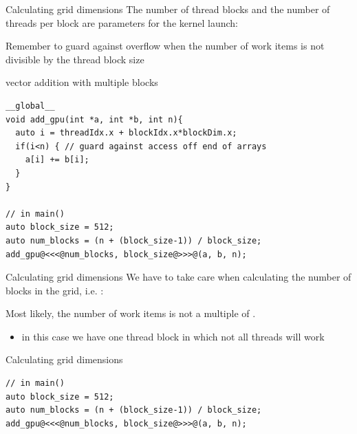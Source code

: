 \begin{frame}[fragile]{}
    \begin{info}{Calculating grid dimensions}
            The number of thread blocks and the number of threads per block are parameters for the kernel launch:
            \begin{center}
            \end{center}
            Remember to guard against overflow when the number of work items is not divisible by the thread block size
    \end{info}

    \begin{code}{vector addition with multiple blocks}
        \begin{lstlisting}[style=boxcudatiny]
__global__
void add_gpu(int *a, int *b, int n){
  auto i = threadIdx.x + blockIdx.x*blockDim.x;
  if(i<n) { // guard against access off end of arrays
    a[i] += b[i];
  }
}

// in main()
auto block_size = 512;
auto num_blocks = (n + (block_size-1)) / block_size;
add_gpu@<<<@num_blocks, block_size@>>>@(a, b, n);
        \end{lstlisting}
    \end{code}
\end{frame}

\begin{frame}[fragile]{}
    \begin{info}{Calculating grid dimensions}
        We have to take care when calculating the number of blocks in the grid, i.e. :
        \begin{center}
        \end{center}
        Most likely, the number of work items  is not a multiple of .
        \begin{itemize}
            \item in this case we have one thread block in which not all threads will work
        \end{itemize}
    \end{info}

    \begin{code}{Calculating grid dimensions}
        \begin{lstlisting}[style=boxcudatiny]
// in main()
auto block_size = 512;
auto num_blocks = (n + (block_size-1)) / block_size;
add_gpu@<<<@num_blocks, block_size@>>>@(a, b, n);
        \end{lstlisting}
    \end{code}
\end{frame}

